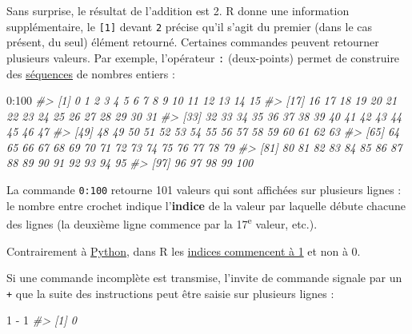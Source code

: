 \documentclass[
  french,
]{scrbook}
\newenvironment{Shaded}{\begin{snugshade}}{\end{snugshade}}
\newcommand{\CommentTok}[1]{\textcolor[rgb]{0.56,0.35,0.01}{\textit{#1}}}
\newcommand{\DecValTok}[1]{\textcolor[rgb]{0.00,0.00,0.81}{#1}}
\newcommand{\SpecialCharTok}[1]{\textcolor[rgb]{0.00,0.00,0.00}{#1}}
\begin{document}
Sans surprise, le résultat de l'addition est 2. R donne une information supplémentaire, le \texttt{{[}1{]}} devant \texttt{2} précise qu'il s'agit du premier (dans le cas présent, du seul) élément retourné. Certaines commandes peuvent retourner plusieurs valeurs. Par exemple, l'opérateur \texttt{:} (deux-points) permet de construire des \protect\hyperlink{fonctions-sequences}{séquences} de nombres entiers :

\begin{Shaded}
\begin{Highlighting}[]
\DecValTok{0}\SpecialCharTok{:}\DecValTok{100}
\CommentTok{\#\textgreater{}   [1]   0   1   2   3   4   5   6   7   8   9  10  11  12  13  14  15}
\CommentTok{\#\textgreater{}  [17]  16  17  18  19  20  21  22  23  24  25  26  27  28  29  30  31}
\CommentTok{\#\textgreater{}  [33]  32  33  34  35  36  37  38  39  40  41  42  43  44  45  46  47}
\CommentTok{\#\textgreater{}  [49]  48  49  50  51  52  53  54  55  56  57  58  59  60  61  62  63}
\CommentTok{\#\textgreater{}  [65]  64  65  66  67  68  69  70  71  72  73  74  75  76  77  78  79}
\CommentTok{\#\textgreater{}  [81]  80  81  82  83  84  85  86  87  88  89  90  91  92  93  94  95}
\CommentTok{\#\textgreater{}  [97]  96  97  98  99 100}
\end{Highlighting}
\end{Shaded}

La commande \texttt{0:100} retourne 101 valeurs qui sont affichées sur plusieurs lignes : le nombre entre crochet indique l'\textbf{indice} de la valeur par laquelle débute chacune des lignes (la deuxième ligne commence par la 17\textsuperscript{e} valeur, etc.).

\begin{tcolorbox}[fonttitle=\sffamily\bfseries\large,title=Important,colframe=darkgreen]

Contrairement à \href{https://www.python.org/}{Python}, dans R les \protect\hyperlink{subset}{indices commencent à 1} et non à 0.

\end{tcolorbox}

Si une commande incomplète est transmise, l'invite de commande signale par un \texttt{+} que la suite des instructions peut être saisie sur plusieurs lignes :

\begin{Shaded}
\begin{Highlighting}[]
\DecValTok{1} \SpecialCharTok{{-}}
\DecValTok{1}
\CommentTok{\#\textgreater{} [1] 0}
\end{Highlighting}
\end{Shaded}
\end{document}
